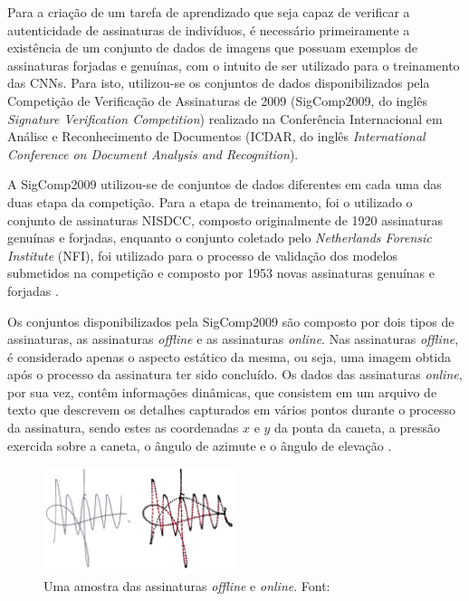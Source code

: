 Para a criação de um tarefa de aprendizado que seja capaz de verificar a autenticidade de assinaturas de indivíduos, é necessário primeiramente a existência de um conjunto de dados de imagens que possuam exemplos de assinaturas forjadas e genuínas, com o intuito de ser utilizado para o treinamento das CNNs. Para isto, utilizou-se os conjuntos de dados disponibilizados pela Competição de Verificação de Assinaturas de 2009 (SigComp2009, do inglês \emph{Signature Verification Competition}) realizado na Conferência Internacional em Análise e Reconhecimento de Documentos (ICDAR, do inglês \emph{International Conference on Document Analysis and Recognition}).

A SigComp2009 utilizou-se de conjuntos de dados diferentes em cada uma das duas etapa da competição. Para a etapa de treinamento, foi o utilizado o conjunto de assinaturas NISDCC, composto originalmente de 1920 assinaturas genuínas e forjadas, enquanto o conjunto coletado pelo \emph{Netherlands Forensic Institute} (NFI), foi utilizado para o processo de validação dos modelos submetidos na competição e composto por 1953 novas assinaturas genuínas e forjadas \cite{icdar2009}.



Os conjuntos disponibilizados pela SigComp2009 são composto por dois tipos de assinaturas, as assinaturas \emph{offline} e as assinaturas \emph{online}. Nas assinaturas \emph{offline}, é considerado apenas o aspecto estático da mesma, ou seja, uma imagem obtida após o processo da assinatura ter sido concluído. Os dados das assinaturas \emph{online}, por sua vez, contêm informações dinâmicas, que consistem em um arquivo de texto que descrevem os detalhes capturados em vários pontos durante o processo da assinatura, sendo estes as coordenadas $x$ e $y$ da ponta da caneta, a pressão exercida sobre a caneta, o ângulo de azimute e o ângulo de elevação \cite{icdar2009}.




\begin{figure}[h!]
\centering
\caption{Uma amostra das assinaturas \emph{offline} e \emph{online}. Font: \cite{icdar2009}}
\label{fig:sample-signature}
\includegraphics[width=0.5\textwidth]{imgs/sample-signature}
\end{figure}


